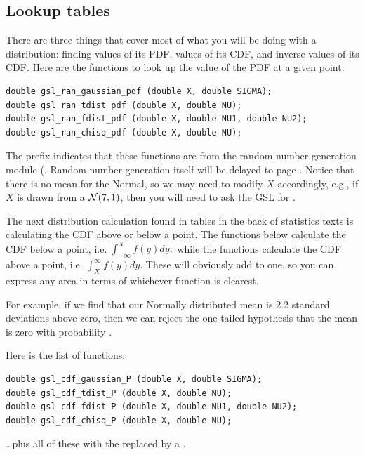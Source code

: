 \subsection{Lookup tables}
There are three things that cover most of what you will be doing with a
distribution: finding values of its PDF, values of its CDF, and inverse
values of its CDF.
Here are the functions to look up the value of the PDF at a given point:

\begin{lstlisting}
double gsl_ran_gaussian_pdf (double X, double SIGMA);
double gsl_ran_tdist_pdf (double X, double NU);
double gsl_ran_fdist_pdf (double X, double NU1, double NU2);
double gsl_ran_chisq_pdf (double X, double NU);
\end{lstlisting}

The prefix  indicates that these
functions are from the random number generation module
(. Random number generation itself will be
delayed to page \pageref{randomnumbers}. Notice that there is no mean
for the Normal, so we may need to modify $X$ accordingly, e.g., if $X$
is drawn from a ${\cal N}(7,1)$, then you will need to ask the GSL for 
.


The next distribution calculation found in tables in the back of
statistics texts is calculating the CDF above or below a point. 
The functions below calculate the CDF below a point, i.e.
$\int_{-\infty}^X f(y) dy,$
while the functions calculate the CDF above a point, i.e.
$\int^{\infty}_X f(y) dy.$
These will obviously add to one, so you can express any area in terms of whichever function is clearest.

For example, if we find that our Normally distributed mean is 2.2 standard
deviations above zero, then we can reject the one-tailed hypothesis that
the mean is zero with probability .

Here is the list of functions:
\begin{lstlisting}
double gsl_cdf_gaussian_P (double X, double SIGMA);
double gsl_cdf_tdist_P (double X, double NU);
double gsl_cdf_fdist_P (double X, double NU1, double NU2);
double gsl_cdf_chisq_P (double X, double NU);
\end{lstlisting}
\dots plus all of these with the  replaced by a .


